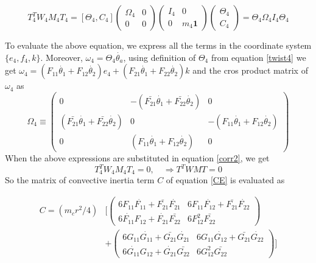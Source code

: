 \begin{equation}
\label{corr2}
T^T_4W_4M_4T_4=[\Theta_4, C_4]\begin{pmatrix}
\Omega_4 &0\\0&0
\end{pmatrix}
\begin{pmatrix}
I_4&0\\0 &m_4 \mathbf{1}
\end{pmatrix}
\begin{pmatrix}
\Theta_4\\C_4
\end{pmatrix}=\Theta_4\Omega_4I_4\Theta_4
\end{equation}

To evaluate the above equation, we express  all the terms in the coordinate system $\{{e_4,f_4,k}\}$. Moreover, $\omega_4=\Theta_4 \dot{\theta_a}$, using definition of $\Theta_4$ from equation \ref{twist4} we get $\omega_4= (F_{11}\dot{\theta_1}+F_{12}\dot{\theta_2})e_4+(F_{21}\dot{\theta_1}+F_{22}\dot{\theta_2})k$ and the cros product matrix of $\omega_4$ as 
\[
 \Omega_4 \equiv \begin{pmatrix}
 0& -(\bar{F_{21}}\dot{\theta_1}+\bar{F_{22}}\dot{\theta_2}) &0\\
 (\bar{F_{21}}\dot{\theta_1}+\bar{F_{22}}\dot{\theta_2}) & 0 & -(F_{11}\dot{\theta_1}+F_{12}\dot{\theta_2}) \\
 0& (F_{11}\dot{\theta_1}+F_{12}\dot{\theta_2}) &0 
 \end{pmatrix}
\]
When the above expressions are substituted in equation  \ref{corr2}, we get
\begin{equation}
T^T_4W_4M_4T_4=0, \quad \Rightarrow T^TWMT=0
\end{equation} 
So the matrix of convective inertia term $C$ of equation \ref{CE} is evaluated as 

\begin{equation}
\label{C_final}
\begin{split}
C=
(m_cr^2/4)& \biggl[ \begin{pmatrix}
6F_{11}\dot{F_{11}}+\bar{F_{21}}\dot{F_{21}} & 6F_{11}\dot{F_{12}}+\bar{F_{21}}\dot{F_{22}}\\
6\dot{F_{11}}F_{12}+\dot{F_{21}}\bar{F_{22}} & 6F_{12}^2\bar{F_{22}}
\end{pmatrix}\\
&+\begin{pmatrix}
6G_{11}\dot{G_{11}}+\bar{G_{21}}\dot{G_{21}} & 6G_{11}\dot{G_{12}}+\bar{G_{21}}\dot{G_{22}}\\
6\dot{G_{11}}G_{12}+\dot{G_{21}}\bar{G_{22}} & 6G_{12}^2\bar{G_{22}}
\end{pmatrix} \biggr]
\end{split}
\end{equation}


